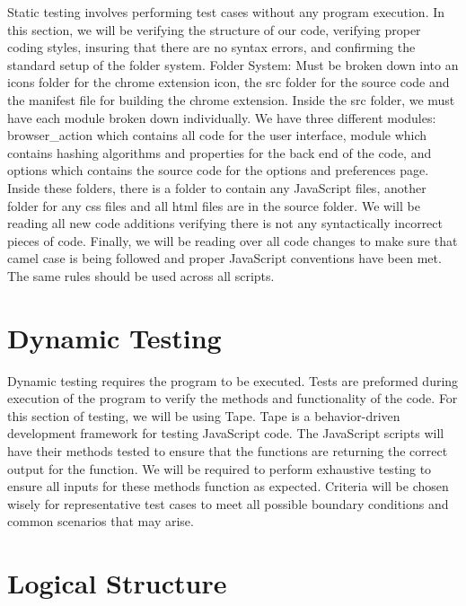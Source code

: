 \documentclass[12pt]{article}
\begin{document}
Static testing involves performing test cases without any program execution. In this section, we will be verifying the structure of our code, verifying proper coding styles, insuring that there are no syntax errors, and confirming the standard setup of the folder system. 
\newline
\newline
Folder System: Must be broken down into an icons folder for the chrome extension icon, the src folder for the source code and the manifest file for building the chrome extension. Inside the src folder, we must have each module broken down individually. We have three different modules: browser\_action which contains all code for the user interface, module which contains hashing algorithms and properties for the back end of the code, and options which contains the source code for the options and preferences page. Inside these folders, there is a folder to contain any JavaScript files, another folder for any css files and all html files are in the source folder.
\newline
\newline
We will be reading all new code additions verifying there is not any syntactically incorrect pieces of code.
\newline
\newline
Finally, we will be reading over all code changes to make sure that camel case is being followed and proper JavaScript conventions have been met. The same rules should be used across all scripts. 

\section{Dynamic Testing}
Dynamic testing requires the program to be executed. Tests are preformed during execution of the program to verify the methods and functionality of the code. For this section of testing, we will be using Tape. Tape is a behavior-driven development framework for testing JavaScript code. The JavaScript scripts will have their methods tested to ensure that the functions are returning the correct output for the function.
\newline
\newline
We will be required to perform exhaustive testing to ensure all inputs for these methods function as expected. Criteria will be chosen wisely for representative test cases to meet all possible boundary conditions and common scenarios that may arise.

\section{Logical Structure}
\end{document}

